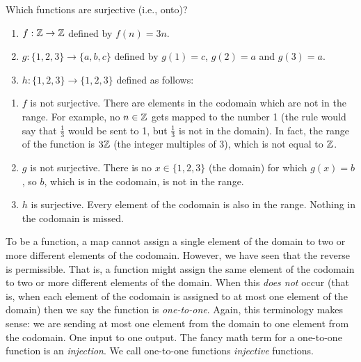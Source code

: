 \documentclass[12pt]{article}
\begin{document}
\begin{example}
  Which functions are surjective (i.e., onto)?
    \begin{enumerate}
    \item $f:\mathbb Z \to \mathbb Z$ defined by $f(n) = 3n$.
    \item $g: \{1,2,3\} \to \{a,b,c\}$ defined by $g(1) = c$, $g(2) = a$ and $g(3) = a$.
    \item $h:\{1,2,3\} \to \{1,2,3\}$ defined as follows:
    \begin{center}
    \end{center}
  \end{enumerate}
  \begin{solution}
    \begin{enumerate}
      \item $f$ is not surjective.  There are elements in the codomain which are not in the range.  For example, no $n \in \mathbb Z$ gets mapped to the number 1 (the rule would say that $\frac{1}{3}$ would be sent to 1, but $\frac{1}{3}$ is not in the domain).  In fact, the range of the function is $3\mathbb Z$ (the integer multiples of 3), which is not equal to $\mathbb Z$.
      \item $g$ is not surjective.  There is no $x \in \{1,2,3\}$ (the domain) for which $g(x) = b$,  so $b$, which is in the codomain, is not in the range.
      \item $h$ is surjective.  Every element of the codomain is also in the range.  Nothing in the codomain is missed.
    \end{enumerate}

  \end{solution}

\end{example}


To be a function, a map cannot assign a single element of the domain to two or more different elements of the codomain.  However, we have seen that the reverse is permissible.  That is, a function might assign the same element of the codomain to two or more different elements of the domain.  When this \emph{does not} occur (that is, when each element of the codomain is assigned to at most one element of the domain) then we say the function is \emph{one-to-one}.  Again, this terminology makes sense: we are sending at most one element from the domain to one element from the codomain.  One input to one output. The fancy math term for a one-to-one function is an \emph{injection}.  We call one-to-one functions \emph{injective} functions.
\end{document}
